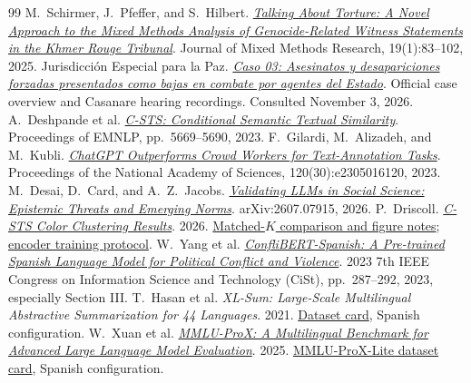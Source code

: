 \documentclass{article}
\begin{document}
\clearpage
\begin{thebibliography}{99}
\small
\setlength{\itemsep}{1pt}
 M.~Schirmer, J.~Pfeffer, and S.~Hilbert. \href{https://doi.org/10.1177/15586898231218463}{\emph{Talking About Torture: A Novel Approach to the Mixed Methods Analysis of Genocide-Related Witness Statements in the Khmer Rouge Tribunal}}. Journal of Mixed Methods Research, 19(1):83--102, 2025.
 Jurisdicci\'on Especial para la Paz. \href{https://www.jep.gov.co/macrocasos/caso03.html}{\emph{Caso 03: Asesinatos y desapariciones forzadas presentados como bajas en combate por agentes del Estado}}. Official case overview and Casanare hearing recordings. Consulted November 3, 2026.
 A.~Deshpande et al. \href{https://aclanthology.org/2023.emnlp-main.345/}{\emph{C-STS: Conditional Semantic Textual Similarity}}. Proceedings of EMNLP, pp.~5669--5690, 2023.
 F.~Gilardi, M.~Alizadeh, and M.~Kubli. \href{https://doi.org/10.1073/pnas.2305016120}{\emph{ChatGPT Outperforms Crowd Workers for Text-Annotation Tasks}}. Proceedings of the National Academy of Sciences, 120(30):e2305016120, 2023.
 M.~Desai, D.~Card, and A.~Z.~Jacobs. \href{https://arxiv.org/abs/2607.07915}{\emph{Validating LLMs in Social Science: Epistemic Threats and Emerging Norms}}. arXiv:2607.07915, 2026.
 P.~Driscoll. \href{https://github.com/pvd232/JEP/blob/9efa1d385fcc67f4daabc7f606f83263e8cdba0a/training_outputs/color_clustering_20261104/report.md}{\emph{C-STS Color Clustering Results}}. 2026. \href{https://github.com/pvd232/JEP/blob/9efa1d385fcc67f4daabc7f606f83263e8cdba0a/training_outputs/color_clustering_20261104/key_charts/matched-k/README.md}{Matched-\(K\) comparison and figure notes}; \href{https://github.com/pvd232/JEP/blob/9efa1d385fcc67f4daabc7f606f83263e8cdba0a/training_outputs/proposition_full_20261026/comparison_report.md}{encoder training protocol}.
 W.~Yang et al. \href{https://doi.org/10.1109/CiSt56084.2023.10409883}{\emph{ConfliBERT-Spanish: A Pre-trained Spanish Language Model for Political Conflict and Violence}}. 2023 7th IEEE Congress on Information Science and Technology (CiSt), pp.~287--292, 2023, especially Section III.
 T.~Hasan et al. \emph{XL-Sum: Large-Scale Multilingual Abstractive Summarization for 44 Languages}. 2021. \href{https://huggingface.co/datasets/csebuetnlp/xlsum}{Dataset card}, Spanish configuration.
 W.~Xuan et al. \href{https://arxiv.org/abs/2503.10497}{\emph{MMLU-ProX: A Multilingual Benchmark for Advanced Large Language Model Evaluation}}. 2025. \href{https://huggingface.co/datasets/li-lab/MMLU-ProX-Lite}{MMLU-ProX-Lite dataset card}, Spanish configuration.

\end{thebibliography}
\end{document}
